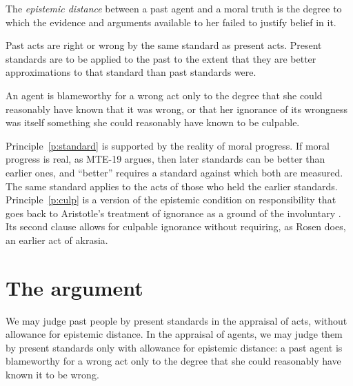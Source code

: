 \documentclass{situationist-preprint}
\begin{document}
\begin{definition}\label{d:distance}
The \emph{epistemic distance} between a past agent and a moral truth is the degree to which the evidence and arguments available to her failed to justify belief in it.
\end{definition}

\begin{principle}\label{p:standard}
Past acts are right or wrong by the same standard as present acts. Present standards are to be applied to the past to the extent that they are better approximations to that standard than past standards were.
\end{principle}

\begin{principle}[Culpability]\label{p:culp}
An agent is blameworthy for a wrong act only to the degree that she could reasonably have known that it was wrong, or that her ignorance of its wrongness was itself something she could reasonably have known to be culpable.
\end{principle}

Principle~\ref{p:standard} is supported by the reality of moral progress. If moral progress is real, as MTE-19 argues, then later standards can be better than earlier ones, and ``better'' requires a standard against which both are measured. The same standard applies to the acts of those who held the earlier standards. Principle~\ref{p:culp} is a version of the epistemic condition on responsibility that goes back to Aristotle's treatment of ignorance as a ground of the involuntary \citep[III.1]{AristotleNE}. Its second clause allows for culpable ignorance without requiring, as Rosen does, an earlier act of akrasia.

\section{The argument}

\begin{theorem}\label{t:main}
We may judge past people by present standards in the appraisal of acts, without allowance for epistemic distance. In the appraisal of agents, we may judge them by present standards only with allowance for epistemic distance: a past agent is blameworthy for a wrong act only to the degree that she could reasonably have known it to be wrong.
\end{theorem}
\end{document}
